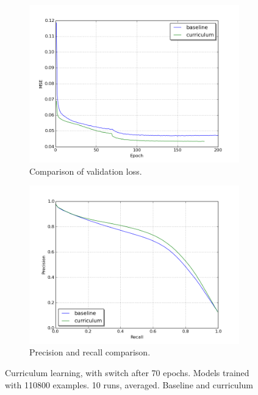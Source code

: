 \begin{figure}
\begin{subfigure}{0.48\textwidth}
\includegraphics[width=\linewidth]{figs/curr50/loss_compare_validation.png}
\caption{Comparison of validation loss.} \label{fig:curr50_loss}
\end{subfigure}
\hspace*{\fill} %
\begin{subfigure}{0.48\textwidth}
\includegraphics[width=\linewidth]{figs/curr50/validation_precision_recall_curve.png}
\caption{Precision and recall comparison.} \label{fig:curr50_pr}
\end{subfigure}
\hspace*{\fill} %
\caption{Curriculum learning, with switch after 70 epochs. Models trained with 110800 examples. 10 runs, averaged. Baseline and curriculum} \label{fig:curr50}
\end{figure}


